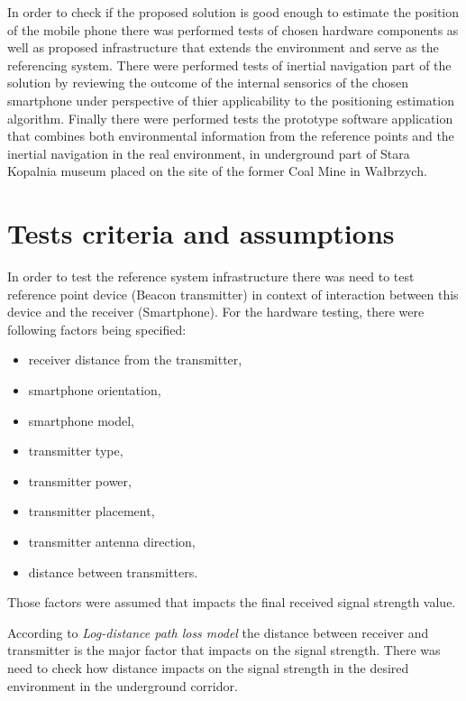 \documentclass[../main.tex]{subfiles}
\begin{document}
In order to check if the proposed solution is good enough to estimate the position of the mobile phone there was performed tests of chosen hardware components as well as proposed infrastructure that extends the environment and serve as the referencing system. There were performed tests of inertial navigation part of the solution by reviewing the outcome of the internal sensorics of the chosen smartphone under perspective of thier applicability to the positioning estimation algorithm. Finally there were performed tests the prototype software application that combines both environmental information from the reference points and the inertial navigation in the real environment, in underground part of Stara Kopalnia museum placed on the site of the former Coal Mine in Wałbrzych.

\section{Tests criteria and assumptions} %
\label{sec:tests_criteria_and_assumptions}

In order to test the reference system infrastructure there was need to test reference point device (Beacon transmitter) in context of interaction between this device and the receiver (Smartphone). For the hardware testing, there were following factors being specified:
\begin{itemize}
	\item receiver distance from the transmitter,
	\item smartphone orientation,
	\item smartphone model,
	\item transmitter type,
	\item transmitter power,
	\item transmitter placement,
	\item transmitter antenna direction,
	\item distance between transmitters.
\end{itemize}

Those factors were assumed that impacts the final received signal strength value.

According to \textit{Log-distance path loss model} \cite{RSSI_path_loss_prediction_model} the distance between receiver and transmitter is the major factor that impacts on the signal strength. There was need to check how distance impacts on the signal strength in the desired environment in the underground corridor.
\end{document}
